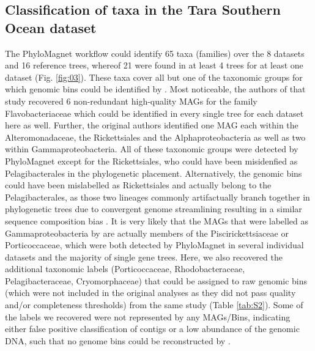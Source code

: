 \documentclass[a4paper]{article}
\begin{document}
\subsection{Classification of taxa in the Tara Southern Ocean dataset}
The PhyloMagnet workflow could identify 65 taxa (families) over the 8 datasets and 16 reference trees, whereof 21 were found in at least 4 trees for at least one dataset (Fig. \ref{fig:03}). These taxa cover all but one of the taxonomic groups for which genomic bins could be identified by \citet[][marked with an asterisk in Fig. \ref{fig:03}]{Delmont2018}. Most noticeable, the authors of that study recovered 6 non-redundant high-quality MAGs for the family Flavobacteriaceae which could be identified in every single tree for each dataset here as well. Further, the original authors identified one MAG each within the Alteromonadaceae, the Rickettsiales and the Alphaproteobacteria as well as two within Gammaproteobacteria. All of these taxonomic groups were detected by PhyloMagnet except for the Rickettsiales, who could have been misidenfied as Pelagibacterales in the phylogenetic placement. Alternatively, the genomic bins could have been mislabelled as Rickettsiales and actually belong to the Pelagibacterales, as those two lineages commonly artifactually branch together in phylogenetic trees due to convergent genome streamlining resulting in a similar sequence composition bias \citep{Roger2017,Martijn2018,Rodriguez-Ezpeleta2012,Viklund2013}. It is very likely that the MAGs that were labelled as Gammaproteobacteria by \citet{Delmont2018} are actually members of the Piscirickettsiaceae or Porticoccaceae, which were both detected by PhyloMagnet in several individual datasets and the majority of single gene trees. Here, we also recovered the additional taxonomic labels (Porticoccaceae, Rhodobacteraceae, Pelagibacteraceae, Cryomorphaceae) that could be assigned to raw genomic bins (which were not included in the original analyses as they did not pass quality and/or completeness thresholds) from the same study (Table \ref{tab:S2}). Some of the labels we recovered were not represented by any MAGs/Bins, indicating either false positive classification of contigs or a low abundance of the genomic DNA, such that no genome bins could be reconstructed by \citet{Delmont2018}.
\end{document}
